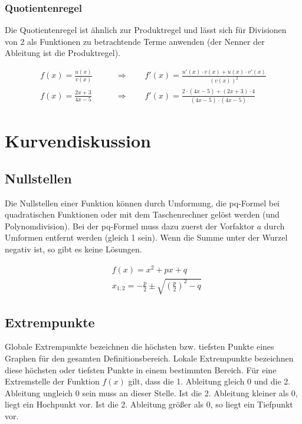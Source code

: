 \subsubsection{Quotientenregel}

Die Quotientenregel ist ähnlich zur Produktregel und lässt sich für Divisionen von 2 als
Funktionen zu betrachtende Terme anwenden (der Nenner der Ableitung ist die Produktregel).

\begin{align*}
    f(x) = \frac{u(x)}{v(x)} \qquad & \Rightarrow \qquad f'(x) = \frac{u'(x) \cdot v(x) + u(x) \cdot v'(x)}{(v(x))^2} \\[15pt]
    f(x) = \frac{2x + 3}{4x - 5} \qquad & \Rightarrow \qquad f'(x) = \frac{2 \cdot (4x - 5) + (2x + 3) \cdot 4}{(4x - 5) \cdot (4x - 5)}
\end{align*}

\clearpage

\section{Kurvendiskussion}

\subsection{Nullstellen}

Die Nullstellen einer Funktion können durch Umformung, die pq-Formel bei quadratischen Funktionen oder
mit dem Taschenrechner gelöst werden (und Polynomdivision).
Bei der pq-Formel muss dazu zuerst der Vorfaktor $a$ durch Umformen entfernt werden
(gleich 1 sein). Wenn die Summe unter der Wurzel negativ ist, so gibt es keine Lösungen.

\begin{align*}
    & f(x) = x^2 + px +q \\[10pt]
    & x_{1,2} = -\frac{p}{2} \pm \sqrt{(\frac{p}{2})^2 - q}
\end{align*}

\subsection{Extrempunkte}

Globale Extrempunkte bezeichnen die höchsten bzw. tiefsten Punkte eines Graphen für den
gesamten Definitionsbereich. Lokale Extrempunkte bezeichnen diese höchsten oder tiefsten
Punkte in einem bestimmten Bereich.
Für eine Extremstelle der Funktion $f(x)$ gilt, dass die 1. Ableitung gleich 0 und die 2.
Ableitung ungleich 0 sein muss an dieser Stelle.
Ist die 2. Ableitung kleiner als 0, liegt ein Hochpunkt vor.
Ist die 2. Ableitung größer als 0, so liegt ein Tiefpunkt vor.

